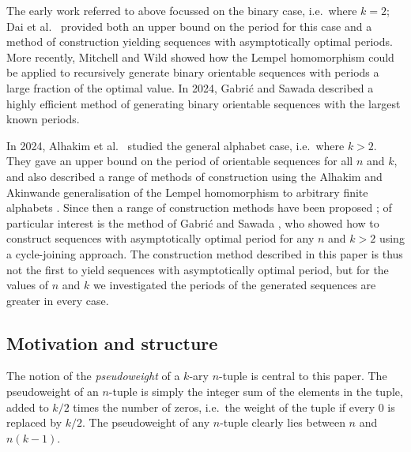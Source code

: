 \documentclass[a4paper,11pt]{article}
\theoremstyle{plain}
\theoremstyle{definition}
\theoremstyle{remark}
\begin{document}
The early work referred to above focussed on the binary case, i.e.\ where $k=2$; Dai et al.\
\cite{Dai93} provided both an upper bound on the period for this case and a method of construction
yielding sequences with asymptotically optimal periods. More recently, Mitchell and Wild
\cite{Mitchell22} showed how the Lempel homomorphism \cite{Lempel70} could be applied to
recursively generate binary orientable sequences with periods a large fraction of the optimal
value.  In 2024, Gabri\'{c} and Sawada \cite{Gabric24,Gabric24b} described a highly efficient
method of generating binary orientable sequences with the largest known periods.

In 2024, Alhakim et al.\ \cite{Alhakim24a} studied the general alphabet case, i.e.\ where $k>2$.
They gave an upper bound on the period of orientable sequences for all $n$ and $k$, and also
described a range of methods of construction using the Alhakim and Akinwande generalisation of the
Lempel homomorphism to arbitrary finite alphabets \cite{Alhakim11}.  Since then a range of
construction methods have been proposed \cite{Gabric25,Mitchell26,Mitchell25a}; of particular
interest is the method of Gabri\'{c} and Sawada \cite{Gabric25}, who showed how to construct
sequences with asymptotically optimal period for any $n$ and $k>2$ using a cycle-joining approach.
The construction method described in this paper is thus not the first to yield sequences with
asymptotically optimal period, but for the values of $n$ and $k$ we investigated the periods of the
generated sequences are greater in every case.


\subsection{Motivation and structure}  \label{subsection:motivation}

The notion of the \emph{pseudoweight} of a $k$-ary $n$-tuple is central to this paper. The
pseudoweight of an $n$-tuple is simply the integer sum of the elements in the tuple, added to $k/2$
times the number of zeros, i.e.\ the weight of the tuple if every 0 is replaced by $k/2$. The
pseudoweight of any $n$-tuple clearly lies between $n$ and $n(k-1)$.
\end{document}
